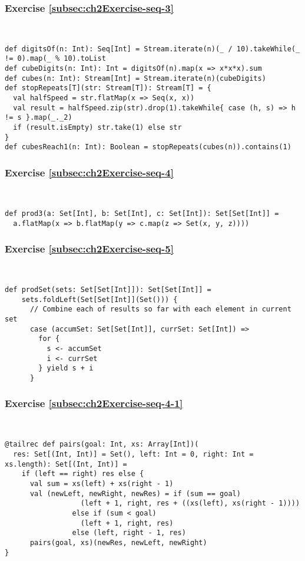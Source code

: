 \subsubsection*{Exercise \ref{subsec:ch2Exercise-seq-3}}

~
\begin{lstlisting}
def digitsOf(n: Int): Seq[Int] = Stream.iterate(n)(_ / 10).takeWhile(_ != 0).map(_ % 10).toList
def cubeDigits(n: Int): Int = digitsOf(n).map(x => x*x*x).sum
def cubes(n: Int): Stream[Int] = Stream.iterate(n)(cubeDigits)
def stopRepeats[T](str: Stream[T]): Stream[T] = {
  val halfSpeed = str.flatMap(x => Seq(x, x))
  val result = halfSpeed.zip(str).drop(1).takeWhile{ case (h, s) => h != s }.map(_._2)
  if (result.isEmpty) str.take(1) else str
}
def cubesReach1(n: Int): Boolean = stopRepeats(cubes(n)).contains(1)
\end{lstlisting}


\subsubsection*{Exercise \ref{subsec:ch2Exercise-seq-4}}

~
\begin{lstlisting}
def prod3(a: Set[Int], b: Set[Int], c: Set[Int]): Set[Set[Int]] =
  a.flatMap(x => b.flatMap(y => c.map(z => Set(x, y, z))))
\end{lstlisting}


\subsubsection*{Exercise \ref{subsec:ch2Exercise-seq-5}}

~
\begin{lstlisting}
def prodSet(sets: Set[Set[Int]]): Set[Set[Int]] =
    sets.foldLeft(Set[Set[Int]](Set())) {
      // Combine each of results so far with each element in current set
      case (accumSet: Set[Set[Int]], currSet: Set[Int]) =>
        for {
          s <- accumSet
          i <- currSet
        } yield s + i
      }
\end{lstlisting}


\subsubsection*{Exercise \ref{subsec:ch2Exercise-seq-4-1}}

~
\begin{lstlisting}
@tailrec def pairs(goal: Int, xs: Array[Int])(
  res: Set[(Int, Int)] = Set(), left: Int = 0, right: Int = xs.length): Set[(Int, Int)] =
    if (left == right) res else {
      val sum = xs(left) + xs(right - 1)
      val (newLeft, newRight, newRes) = if (sum == goal) 
                  (left + 1, right, res + ((xs(left), xs(right - 1)))) 
                else if (sum < goal)
                  (left + 1, right, res)
                else (left, right - 1, res)
      pairs(goal, xs)(newRes, newLeft, newRight)
}
\end{lstlisting}


